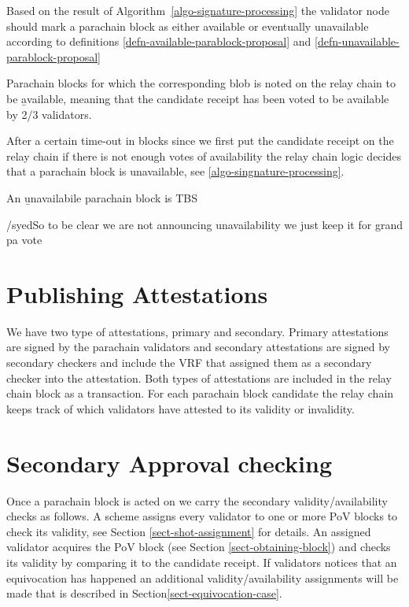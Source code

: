 Based on the result of Algorithm~\ref{algo-signature-processing} the validator
node should mark a parachain block as either available or eventually unavailable
according to definitions \ref{defn-available-parablock-proposal} and
\ref{defn-unavailable-parablock-proposal}
\begin{definition}
  \label{defn-available-parablock-proposal}
        Parachain blocks for which the corresponding blob is  noted on the relay
        chain to be {\b available}, meaning that the candidate receipt has been
        voted to be available by 2/3 validators.
\end{definition}

After a certain time-out in blocks since we first put the candidate receipt on
the relay chain if there is not enough votes of availability the relay chain
logic decides that a parachain block is unavailable, see
\ref{algo-singnature-processing}.

\begin{definition}
  \label{defn-unavailable-parachain-block}
       An {\b unavailabile parachain block} is TBS
\end{definition}

/syed{}{So to be clear we are not announcing unavailability we just keep it for
grand pa vote}

\section{Publishing Attestations}
\label{sect-publishing-attestations}
 We have two type of attestations, primary and secondary.
  Primary attestations are signed by the parachain validators and secondary
  attestations are signed by secondary checkers and include the VRF that
  assigned them as a secondary checker into the attestation. Both types of
  attestations are included in the relay chain block as a transaction. For each
  parachain block candidate the relay chain keeps track of which validators have
  attested to its validity or invalidity.

\section{Secondary Approval checking}
\label{sect-approval-checking}
Once a parachain block is acted on we carry the secondary validity/availability
checks as follows. A scheme assigns every validator to one or more PoV blocks to
check its validity, see Section \ref{sect-shot-assignment} for details. An
assigned validator acquires the PoV block (see Section
\ref{sect-obtaining-block}) and checks its validity by comparing it to the
candidate receipt. If validators notices that an equivocation has happened an
additional validity/availability assignments will be made that is described in
Section\ref{sect-equivocation-case}.

